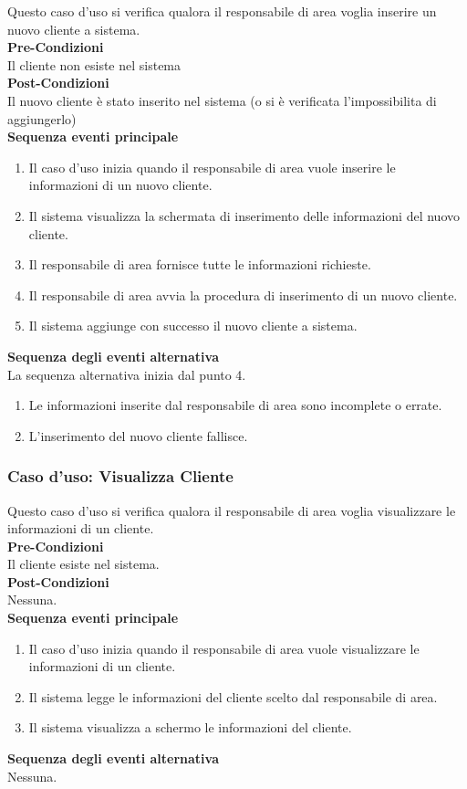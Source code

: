 \documentclass[green, fancy, 11pt]{elegantbook}
\begin{document}
Questo caso d’uso si verifica qualora il responsabile di area voglia inserire un nuovo cliente a sistema.\\
\textbf{Pre-Condizioni}\\
Il cliente non esiste nel sistema\\
\textbf{Post-Condizioni}\\
Il nuovo cliente è stato inserito nel sistema (o si è verificata l’impossibilita di aggiungerlo)\\
\textbf{Sequenza eventi principale}
\begin{enumerate}
	\item Il caso d’uso inizia quando il responsabile di area vuole inserire le informazioni di un nuovo cliente.
	\item Il sistema visualizza la schermata di inserimento delle informazioni del nuovo cliente.
	\item Il responsabile di area fornisce tutte le informazioni richieste.
	\item Il responsabile di area avvia la procedura di inserimento di un nuovo cliente.
	\item Il sistema aggiunge con successo il nuovo cliente a sistema.
\end{enumerate}
\textbf{Sequenza degli eventi alternativa}\\
La sequenza alternativa inizia dal punto 4.
\begin{enumerate}
	\item Le informazioni inserite dal responsabile di area sono incomplete o errate.
	\item L’inserimento del nuovo cliente fallisce.
\end{enumerate}
\newpage

\subsubsection{Caso d'uso: Visualizza Cliente}

Questo caso d’uso si verifica qualora il responsabile di area voglia visualizzare le informazioni di un cliente.\\
\textbf{Pre-Condizioni}\\
Il cliente esiste nel sistema.\\
\textbf{Post-Condizioni}\\
Nessuna.\\
\textbf{Sequenza eventi principale}
\begin{enumerate}
	\item Il caso d’uso inizia quando il responsabile di area vuole visualizzare le informazioni di un cliente.
	\item Il sistema legge le informazioni del cliente scelto dal responsabile di area.
	\item Il sistema visualizza a schermo le informazioni del cliente.
\end{enumerate}
\textbf{Sequenza degli eventi alternativa}\\
Nessuna.
\end{document}
